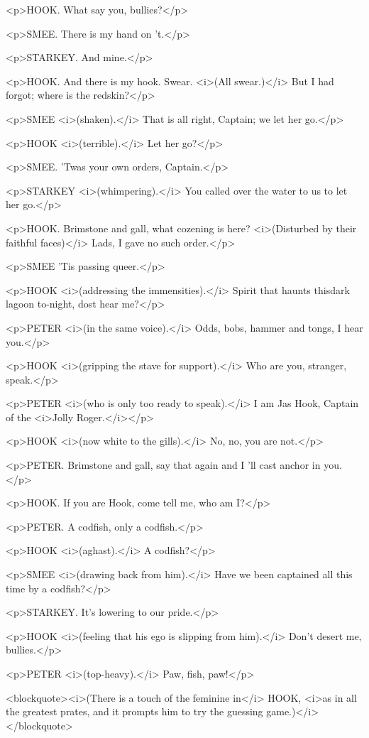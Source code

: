 <p>HOOK. What say you, bullies?</p>

<p>SMEE. There is my hand on 't.</p>

<p>STARKEY. And mine.</p>

<p>HOOK. And there is my hook. Swear. <i>(All swear.)</i> But I had
forgot; where is the redskin?</p>

<p>SMEE <i>(shaken).</i> That is all right, Captain; we let her
go.</p>

<p>HOOK <i>(terrible).</i> Let her go?</p>

<p>SMEE. 'Twas your own orders, Captain.</p>

<p>STARKEY <i>(whimpering).</i> You called over the water to us to
let her go.</p>

<p>HOOK. Brimstone and gall, what cozening is here? <i>(Disturbed by
their faithful faces)</i> Lads, I gave no such order.</p>

<p>SMEE 'Tis passing queer.</p>

<p>HOOK <i>(addressing the immensities).</i> Spirit that haunts
thisdark lagoon to-night, dost hear me?</p>

<p>PETER <i>(in the same voice).</i> Odds, bobs, hammer and tongs, I
hear you.</p>

<p>HOOK <i>(gripping the stave for support).</i> Who are you,
stranger, speak.</p>

<p>PETER <i>(who is only too ready to speak).</i> I am Jas Hook,
Captain of the <i>Jolly Roger.</i></p>

<p>HOOK <i>(now white to the gills).</i> No, no, you are not.</p>

<p>PETER. Brimstone and gall, say that again and I 'll cast anchor in
you.</p>

<p>HOOK. If you are Hook, come tell me, who am I?</p>

<p>PETER. A codfish, only a codfish.</p>

<p>HOOK <i>(aghast).</i> A codfish?</p>

<p>SMEE <i>(drawing back from him).</i> Have we been captained all
this time by a codfish?</p>

<p>STARKEY. It's lowering to our pride.</p>

<p>HOOK <i>(feeling that his ego is slipping from him).</i> Don't
desert me, bullies.</p>

<p>PETER <i>(top-heavy).</i> Paw, fish, paw!</p>

<blockquote><i>(There is a touch of the feminine in</i> HOOK, <i>as
in all the greatest prates, and it prompts him to try the guessing
game.)</i></blockquote>

